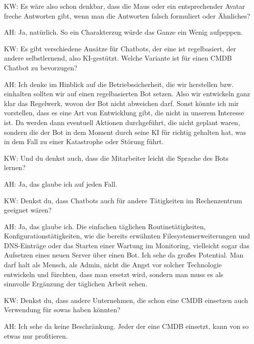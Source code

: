 \begin{list}{X:}{\setlength{\labelsep}{5mm}}
\item [KW:] Es wäre also schon denkbar, dass die Maus oder ein entsprechender Avatar freche Antworten gibt, wenn man die Antworten falsch formuliert oder Ähnliches? 
\item [AH:] Ja, natürlich. So ein Charakterzug würde das Ganze ein Wenig aufpeppen.
\item [KW:] Es gibt verschiedene Ansätze für Chatbots, der eine ist regelbasiert, der andere selbstlernend, also KI-gestützt. Welche Variante ist für einen CMDB Chatbot zu bevorzugen?
\item [AH:] Ich denke im Hinblick auf die Betriebssicherheit, die wir herstellen bzw. einhalten sollten wir auf einen regelbasierten Bot setzen. Also wir entwickeln ganz klar das Regelwerk, wovon der Bot nicht abweichen darf. Sonst könnte ich mir vorstellen, dass es eine Art von Entwicklung gibt, die nicht in unserem Interesse ist. Da werden dann eventuell Aktionen durchgeführt, die nicht geplant waren, sondern die der Bot in dem Moment durch seine KI für richtig gehalten hat, was in dem Fall zu einer Katastrophe oder Störung führt.
\item [KW:] Und du denkst auch, dass die Mitarbeiter leicht die Sprache des Bots lernen?
\item [AH:] Ja, das glaube ich auf jeden Fall.
\item [KW:] Denkst du, dass Chatbots auch für andere Tätigkeiten im Rechenzentrum geeignet wären?
\item [AH:] Ja, das glaube ich. Die einfachen täglichen Routinetätigkeiten, Konfigurationstätigkeiten, wie die bereits erwähnten Filesystemerweiterungen und DNS-Einträge oder das Starten einer Wartung im Monitoring, vielleicht sogar das Aufsetzen eines neuen Server über einen Bot. Ich sehe da großes Potential. Man darf halt als Mensch, als Admin, nicht die Angst vor solcher Technologie entwickeln und fürchten, dass man ersetzt wird, sondern man muss es als sinnvolle Ergänzung der täglichen Arbeit sehen.
\item [KW:] Denkst du, dass andere Unternehmen, die schon eine CMDB einsetzen auch Verwendung für sowas haben könnten?
\item [AH:] Ich sehe da keine Beschränkung. Jeder der eine CMDB einsetzt, kann von so etwas nur profitieren.
\end{list}
